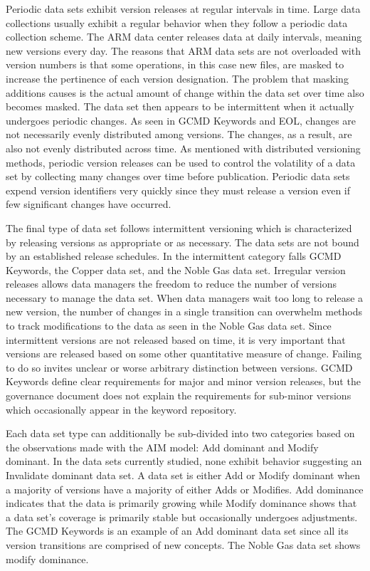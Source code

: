 Periodic data sets exhibit version releases at regular intervals in time.  Large data collections usually exhibit a regular behavior when they follow a periodic data collection scheme.
The ARM data center releases data at daily intervals, meaning new versions every day.
The reasons that ARM data sets are not overloaded with version numbers is that some operations, in this case new files, are masked to increase the pertinence of each version designation.
The problem that masking additions causes is the actual amount of change within the data set over time also becomes masked.
The data set then appears to be intermittent when it actually undergoes periodic changes.  As seen in GCMD Keywords and EOL, changes are not necessarily evenly distributed among versions.  The changes, as a result, are also not evenly distributed across time.  As mentioned with distributed versioning methods, periodic version releases can be used to control the volatility of a data set by collecting many changes over time before publication.  Periodic data sets expend version identifiers very quickly since they must release a version even if few significant changes have occurred.

The final type of data set follows intermittent versioning which is characterized by releasing versions as appropriate or as necessary.  The data sets are not bound by an established release schedules.  In the intermittent category falls GCMD Keywords, the Copper data set, and the Noble Gas data set.  Irregular version releases allows data managers the freedom to reduce the number of versions necessary to manage the data set.  When data managers wait too long to release a new version, the number of changes in a single transition can overwhelm methods to track modifications to the data as seen in the Noble Gas data set.  Since intermittent versions are not released based on time, it is very important that versions are released based on some other quantitative measure of change.  Failing to do so invites unclear or worse arbitrary distinction between versions.  GCMD Keywords define clear requirements for major and minor version releases, but the governance document does not explain the requirements for sub-minor versions which occasionally appear in the keyword repository.

Each data set type can additionally be sub-divided into two categories based on the observations made with the AIM model: Add dominant and Modify dominant.  In the data sets currently studied, none exhibit behavior suggesting an Invalidate dominant data set.  A data set is either Add or Modify dominant when a majority of versions have a majority of either Adds or Modifies.  Add dominance indicates that the data is primarily growing while Modify dominance shows that a data set’s coverage is primarily stable but occasionally undergoes adjustments.  The GCMD Keywords is an example of an Add dominant data set since all its version transitions are comprised of new concepts.  The Noble Gas data set shows modify dominance.